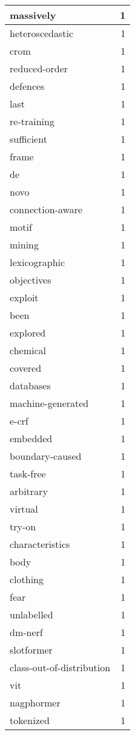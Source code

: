 \begin{table}[h]
\begin{tabular}{|l|r|}
\hline
massively & 1 \\
\hline
heteroscedastic & 1 \\
\hline
crom & 1 \\
\hline
reduced-order & 1 \\
\hline
defences & 1 \\
\hline
last & 1 \\
\hline
re-training & 1 \\
\hline
sufficient & 1 \\
\hline
frame & 1 \\
\hline
de & 1 \\
\hline
novo & 1 \\
\hline
connection-aware & 1 \\
\hline
motif & 1 \\
\hline
mining & 1 \\
\hline
lexicographic & 1 \\
\hline
objectives & 1 \\
\hline
exploit & 1 \\
\hline
been & 1 \\
\hline
explored & 1 \\
\hline
chemical & 1 \\
\hline
covered & 1 \\
\hline
databases & 1 \\
\hline
machine-generated & 1 \\
\hline
e-crf & 1 \\
\hline
embedded & 1 \\
\hline
boundary-caused & 1 \\
\hline
task-free & 1 \\
\hline
arbitrary & 1 \\
\hline
virtual & 1 \\
\hline
try-on & 1 \\
\hline
characteristics & 1 \\
\hline
body & 1 \\
\hline
clothing & 1 \\
\hline
fear & 1 \\
\hline
unlabelled & 1 \\
\hline
dm-nerf & 1 \\
\hline
slotformer & 1 \\
\hline
class-out-of-distribution & 1 \\
\hline
vit & 1 \\
\hline
nagphormer & 1 \\
\hline
tokenized & 1 \\

\end{tabular}
\end{table}
